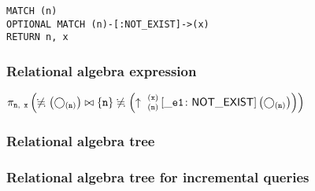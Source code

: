 \begin{lstlisting}
MATCH (n)
OPTIONAL MATCH (n)-[:NOT_EXIST]->(x)
RETURN n, x
\end{lstlisting}

\subsubsection*{Relational algebra expression}

$\projection{\var{n},~\var{x}} \left(\alldifferent{} \left(\getvertices{n}{}\right) \join \{\var{n}\} \alldifferent{} \left(\expandout{n}{x}{}{\_e1}{NOT\_EXIST} \left(\getvertices{n}{}\right)\right)\right)$

\subsubsection*{Relational algebra tree}


\subsubsection*{Relational algebra tree for incremental queries}


